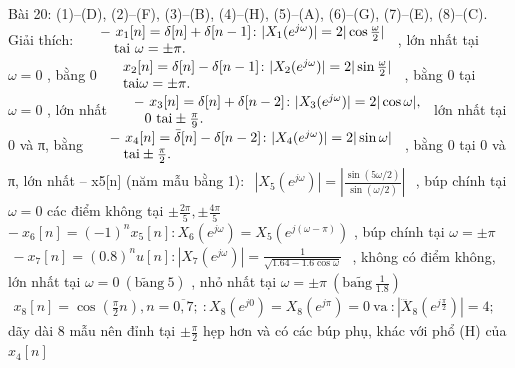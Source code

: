 \documentclass[
  10
]{article}
\begin{document}
Bài 20: (1)--(D), (2)--(F), (3)--(B), (4)--(H), (5)--(A), (6)--(G),
(7)--(E), (8)--(C). Giải thích:
\(\begin{array} { r l } & { - \ x _ { 1 } [ n ] = \delta [ n ] + \delta [ n - 1 ] \colon | X _ { 1 } ( e ^ { j \omega } ) | = 2 | \cos \frac { \omega } { 2 } | } \\ & { \quad \mathrm { t a i } \ \omega = \pm \pi . } \end{array}\)
, lớn nhất tại \(\omega = 0\) , bằng 0
\(\begin{array} { r l } & { x _ { 2 } [ n ] = \delta [ n ] - \delta [ n - 1 ] \colon | X _ { 2 } ( e ^ { j \omega } ) | = 2 | \sin \frac { \omega } { 2 } | } \\ & { \mathrm { t a i } \omega = \pm \pi . } \end{array}\)
, bằng 0 tại \(\omega = 0\) , lớn nhất
\(\begin{array} { r l } & { - \ x _ { 3 } [ n ] = \delta [ n ] + \delta [ n - 2 ] \colon | X _ { 3 } ( e ^ { j \omega } ) | = 2 | \cos \omega | , } \\ & { \phantom { = } 0 \ \mathrm { t a i } \pm \frac { \pi } { 9 } . } \end{array}\)
lớn nhất tại 0 và π, bằng
\(\begin{array} { r l } & { - \ x _ { 4 } [ n ] = \bar { \delta } [ n ] - { \delta } [ n - 2 ] \colon | X _ { 4 } ( e ^ { j \omega } ) | = 2 | \sin \omega | } \\ & { \quad \mathrm { t a i } \pm \frac { \pi } { 2 } . } \end{array}\)
, bằng 0 tại 0 và π, lớn nhất -- x5{[}n{]} (năm mẫu bằng 1):
\(\begin{array} { r } { | X _ { 5 } ( e ^ { j \omega } ) | = \left| \frac { \sin ( 5 \omega / 2 ) } { \sin ( \omega / 2 ) } \right| } \end{array}\)
, búp chính tại \(\omega = 0\) các điểm không tại
\(\textstyle \pm { \frac { 2 \pi } { 5 } } , \pm { \frac { 4 \pi } { 5 } }\)
\(- \ x _ { 6 } [ n ] = ( - 1 ) ^ { n } x _ { 5 } [ n ] \colon X _ { 6 } ( e ^ { j \omega } ) = X _ { 5 } ( e ^ { j ( \omega - \pi ) } )\)
, búp chính tại \(\omega = \pm \pi\)
\(\begin{array} { r } { - \ x _ { 7 } [ n ] = ( 0 . 8 ) ^ { n } u [ n ] \colon | X _ { 7 } ( e ^ { j \omega } ) | = \frac { 1 } { \sqrt { 1 . 6 4 - 1 . 6 \cos \omega } } } \end{array}\)
, không có điểm không, lớn nhất tại
\(\omega = 0 ~ ( \mathrm { b } \tilde { \mathrm { a } } \mathrm { n g } ~ 5 )\)
, nhỏ nhất tại
\(\omega = \pm \pi \ ( \mathrm { b } \tilde { \mathrm { a n g } } \ \frac { 1 } { 1 . 8 } )\)
\(\begin{array} { r } { x _ { 8 } [ n ] = \cos ( \frac { \pi } { 2 } n ) , n = \overline { { 0 , 7 } } ; \ : X _ { 8 } ( e ^ { j 0 } ) = X _ { 8 } ( e ^ { j \pi } ) = 0 \mathrm { \ v a } \ : | \dddot X _ { 8 } ( e ^ { j \frac { \pi } { 2 } } ) | = 4 ; } \end{array}\)
dãy dài 8 mẫu nên đỉnh tại \(\pm \frac { \pi } { 2 }\) hẹp hơn và có các
búp phụ, khác với phổ (H) của \(x _ { 4 } [ n ]\)
\end{document}
